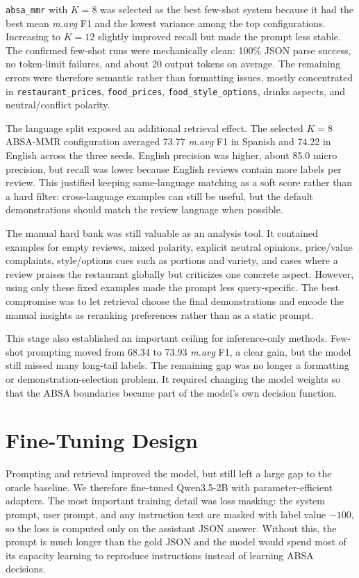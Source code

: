 \documentclass[11pt,a4paper]{article}
\newcommand{\mavg}{\textit{m.avg}}
\newcommand{\code}[1]{\texttt{#1}}
\begin{document}
\code{absa\_mmr} with $K=8$ was selected as the best few-shot system because it had the best mean \mavg{} F1 and the lowest variance among the top configurations. Increasing to $K=12$ slightly improved recall but made the prompt less stable. The confirmed few-shot runs were mechanically clean: 100\% JSON parse success, no token-limit failures, and about 20 output tokens on average. The remaining errors were therefore semantic rather than formatting issues, mostly concentrated in \code{restaurant\_prices}, \code{food\_prices}, \code{food\_style\_options}, drinks aspects, and neutral/conflict polarity.

The language split exposed an additional retrieval effect. The selected $K=8$ ABSA-MMR configuration averaged 73.77 \mavg{} F1 in Spanish and 74.22 in English across the three seeds. English precision was higher, about 85.0 micro precision, but recall was lower because English reviews contain more labels per review. This justified keeping same-language matching as a soft score rather than a hard filter: cross-language examples can still be useful, but the default demonstrations should match the review language when possible.

The manual hard bank was still valuable as an analysis tool. It contained examples for empty reviews, mixed polarity, explicit neutral opinions, price/value complaints, style/options cues such as portions and variety, and cases where a review praises the restaurant globally but criticizes one concrete aspect. However, using only these fixed examples made the prompt less query-specific. The best compromise was to let retrieval choose the final demonstrations and encode the manual insights as reranking preferences rather than as a static prompt.

This stage also established an important ceiling for inference-only methods. Few-shot prompting moved from 68.34 to 73.93 \mavg{} F1, a clear gain, but the model still missed many long-tail labels. The remaining gap was no longer a formatting or demonstration-selection problem. It required changing the model weights so that the ABSA boundaries became part of the model's own decision function.

\section{Fine-Tuning Design}

Prompting and retrieval improved the model, but still left a large gap to the oracle baseline. We therefore fine-tuned Qwen3.5-2B with parameter-efficient adapters. The most important training detail was loss masking: the system prompt, user prompt, and any instruction text are masked with label value $-100$, so the loss is computed only on the assistant JSON answer. Without this, the prompt is much longer than the gold JSON and the model would spend most of its capacity learning to reproduce instructions instead of learning ABSA decisions.
\end{document}
